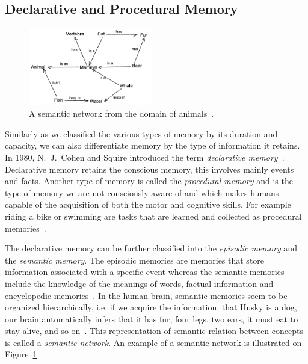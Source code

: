\subsection{Declarative and Procedural Memory}

\begin{figure}
  \centering
  \includegraphics[width=0.48\textwidth]{img/semantic-network}
  \caption{A semantic network from the domain of animals~\cite{semanticnetworkpict}.}
  \label{fig:semantic-network}
\end{figure}

Similarly as we classified the various types of memory by its duration and capacity, we can also differentiate memory by the type of information it retains. In 1980, N.~J.~Cohen and Squire introduced the term \textit{declarative memory}~\cite{cohen1980preserved}. Declarative memory retains the conscious memory, this involves mainly events and facts. Another type of memory is called the \textit{procedural memory} and is the type of memory we are not consciously aware of and which makes humans capable of the acquisition of both the motor and cognitive skills. For example riding a bike or swimming are tasks that are learned and collected as procedural memories~\cite{MichaelW.Eysenck2008}.

The declarative memory can be further classified into the \textit{episodic memory} and the \textit{semantic memory}. The episodic memories are memories that store information associated with a specific event whereas the semantic memories include the knowledge of the meanings of words, factual information and encyclopedic memories~\cite{cohen1980preserved}. In the human brain, semantic memories seem to be organized hierarchically, i.e. if we acquire the information, that Husky is a dog, our brain automatically infers that it has fur, four legs, two ears, it must eat to stay alive, and so on~\cite{mcclelland1995there}. This representation of semantic relation between concepts is called a \textit{semantic network}. An example of a semantic network is illustrated on Figure~\ref{fig:semantic-network}.

